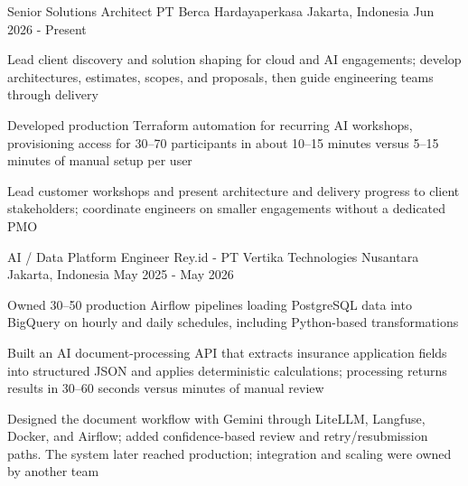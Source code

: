 

\begin{cventries}

  \cventry
    {Senior Solutions Architect}
    {PT Berca Hardayaperkasa}
    {Jakarta, Indonesia}
    {Jun 2026 - Present}
    {
      \begin{cvitems}
        \item {Lead client discovery and solution shaping for cloud and AI engagements; develop architectures, estimates, scopes, and proposals, then guide engineering teams through delivery}
        \item {Developed production Terraform automation for recurring AI workshops, provisioning access for 30--70 participants in about 10--15 minutes versus 5--15 minutes of manual setup per user}
        \item {Lead customer workshops and present architecture and delivery progress to client stakeholders; coordinate engineers on smaller engagements without a dedicated PMO}
      \end{cvitems}
    }

  \cventry
    {AI / Data Platform Engineer}
    {Rey.id - PT Vertika Technologies Nusantara}
    {Jakarta, Indonesia}
    {May 2025 - May 2026}
    {
      \begin{cvitems}
        \item {Owned 30--50 production Airflow pipelines loading PostgreSQL data into BigQuery on hourly and daily schedules, including Python-based transformations}
        \item {Built an AI document-processing API that extracts insurance application fields into structured JSON and applies deterministic calculations; processing returns results in 30--60 seconds versus minutes of manual review}
        \item {Designed the document workflow with Gemini through LiteLLM, Langfuse, Docker, and Airflow; added confidence-based review and retry/resubmission paths. The system later reached production; integration and scaling were owned by another team}
      \end{cvitems}
    }


\end{cventries}
